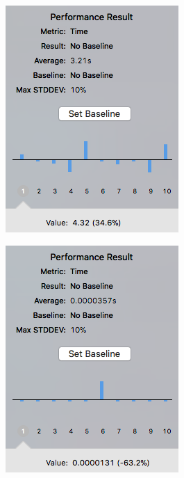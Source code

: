 \begin{figure}[h]
\centering
\begin{minipage}{.5\textwidth}
  \centering
  \includegraphics[width=.65\linewidth]{inc/img/perf/rsakeygen.png}
  \label{sec:eng:performance:rsakeygen:result}
\end{minipage}%
\begin{minipage}{.5\textwidth}
  \centering
  \includegraphics[width=.65\linewidth]{inc/img/perf/aeskeygen.png}
  \label{sec:eng:performance:aeskeygen:result}
\end{minipage}
\end{figure}

